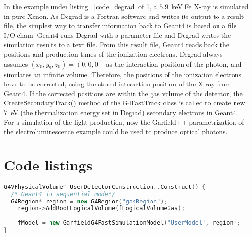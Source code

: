 \documentclass[preprint,12pt,sort&compress]{elsarticle}
\begin{document}
In the example under listing ~\ref{code_degrad} of \ref{app:codelistings}, a $5.9$~keV Fe X-ray is simulated in pure Xenon. As Degrad is a Fortran software and writes its output to a result file, the simplest way to transfer information back to Geant4 is based on a file I/O chain: Geant4 runs Degrad with a parameter file and Degrad writes the simulation results to a text file. From this result file, Geant4 reads back the positions and production times of the ionization electrons. Degrad always assumes $(x_0,y_0,z_0)=(0,0,0)$ as the interaction position of the photon, and simulates an infinite volume. Therefore, the positions of the ionization electrons have to be corrected, using the stored interaction position of the X-ray from Geant4. If the corrected positions are within the gas volume of the detector, the CreateSecondaryTrack() method of the G4FastTrack class is called to create new $7$~eV (the thermalization energy set in Degrad) secondary electrons in Geant4. For a simulation of the light production, now the Garfield++ parametrization of the electroluminescence example could be used to produce optical photons.



\newpage
\appendix
\section{Code listings}
\label{app:codelistings}


  
\begin{lstlisting}[label=code_G4Region,caption=G4Region implementation in the G4VUserDetectorConstruction class in Geant4 sequential mode.,language=C++]
G4VPhysicalVolume* UserDetectorConstruction::Construct() {
  /* Geant4 in sequential mode*/
  G4Region* region = new G4Region("gasRegion");
	region->AddRootLogicalVolume(fLogicalVolumeGas);
	
	fModel = new GarfieldG4FastSimulationModel("UserModel", region);
}
\end{lstlisting}

\newpage
\end{document}
